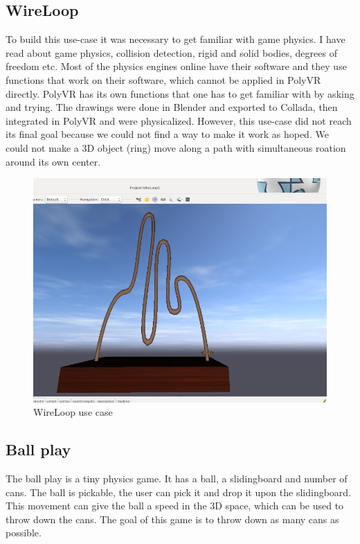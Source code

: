 \subsection{WireLoop}

To build this use-case it was necessary to get familiar with game physics. I have read about game physics, collision detection, rigid and solid bodies, degrees of freedom etc. Most of the physics engines online have their software and they use functions that work on their software, which cannot be applied in PolyVR directly. PolyVR has its own functions that one has to get familiar with by asking and trying. The drawings were done in Blender and exported to Collada, then integrated in PolyVR and were physicalized. However, this use-case did not reach its final goal because we could not find a way to make it work as hoped. 
We could not make a 3D object (ring) move along a path with simultaneous roation around its own center.

\begin{figure}[!h]
	\centering
	\includegraphics[width=.8\textwidth]{./images/shant/image5.png}
	\caption{WireLoop use case}
\end{figure}


\subsection{Ball play}

The ball play is a tiny physics game. It has a ball, a slidingboard and number of cans. The ball is pickable, the user can pick it and drop it upon the slidingboard. This movement can give the ball a speed in the 3D space, which can be used to throw down the cans. The goal of this game is to throw down as many cans as possible.

